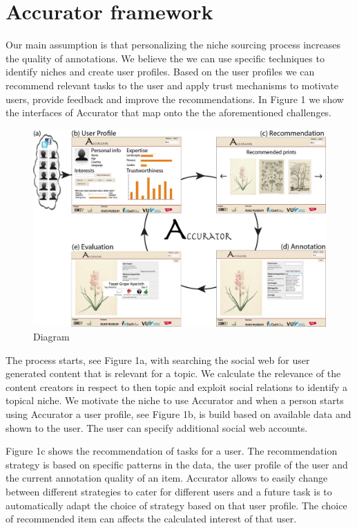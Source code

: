 \section{Accurator framework}
\label{architecture}
Our main assumption is that personalizing the niche sourcing process increases the quality of annotations. We believe the we can use specific techniques to identify niches and create user profiles. Based on the user profiles we can recommend relevant tasks to the user and apply trust mechanisms to motivate users, provide feedback and improve the recommendations. In Figure 1 we show the interfaces of Accurator that map onto the the aforementioned challenges. 

\begin{figure}[hbt]
	\centering
	\includegraphics[width=\textwidth]{accurator_diagram.jpg}
  	\caption{Diagram}
\end{figure}

The process starts, see Figure 1a, with searching the social web for user generated content that is relevant for a topic. We calculate the relevance of the content creators in respect to then topic and exploit social relations to identify a topical niche. We motivate the niche to use Accurator and when a person starts using Accurator a user profile, see Figure 1b, is build based on available data and shown to the user. The user can specify additional social web accounts.

Figure 1c shows the recommendation of tasks for a user. The recommendation strategy is based on specific patterns in the data, the user profile of the user and the current annotation quality of an item. Accurator allows to easily change between different strategies to cater for different users and a future task is to automatically adapt the choice of strategy based on that user profile. The choice of recommended item can affects the calculated interest of that user.

